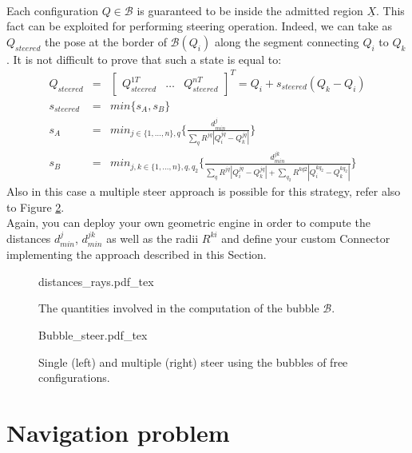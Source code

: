 \\
Each configuration $Q \in \mathcal{B}$ is guaranteed to be inside the admitted region $\underline{X}$. This fact can be exploited for performing steering operation.
Indeed, we can take as $Q_{steered}$ the pose at the border of $\mathcal{B}(Q_i)$ along the segment connecting $Q_i$ to $Q_k$. It is not difficult to prove that such a state is equal to:
\begin{eqnarray}
Q_{steered} &=& \begin{bmatrix} Q_{steered}^{1T} & \hdots & Q_{steered}^{nT} \end{bmatrix}^T =  Q_i + s_{steered} (Q_k - Q_i) \nonumber\\
s_{steered} &=& min \bigg \lbrace s_A, s_B \bigg \rbrace  \nonumber\\
s_A &=& min_{j\in \lbrace 1,\hdots,n \rbrace, q} \bigg \lbrace 
\frac{d^j_{min}}{\sum _q R^{jq} | Q^{jq}_i - Q^{jq}_k |} 
\bigg \rbrace \nonumber\\
s_B &=& min_{j, k\in \lbrace 1,\hdots,n \rbrace, q,q_2} \bigg \lbrace 
\frac{d^{jk}_{min}}{\sum _q R^{jq} | Q^{jq}_i - Q^{jq}_k | + \sum _{q_2} R^{kq2} | Q^{kq_2}_i - Q^{kq_2}_k |}
\bigg \rbrace
\end{eqnarray}
Also in this case a multiple steer approach is possible for this strategy, refer also to Figure \ref{fig:bubbles}.
\\
Again, you can deploy your own geometric engine in order to compute the distances $d^j_{min}$, $d^{jk}_{min}$ as well as the radii $R^{ki}$ and define your custom Connector implementing the approach described in this Section.

 \begin{figure}
	 \centering
 \def\svgwidth{0.85 \columnwidth}
 {distances_rays.pdf_tex} 
	 \caption{The quantities involved in the computation of the bubble $\mathcal{B}$.}
 \label{fig:dist_ray}
 \end{figure}

 \begin{figure}
	 \centering
 \def\svgwidth{0.45 \columnwidth}
 {Bubble_steer.pdf_tex} 
	 \caption{Single (left) and multiple (right) steer using the bubbles of free configurations.}
 \label{fig:bubbles}
 \end{figure}

\section{Navigation problem}

